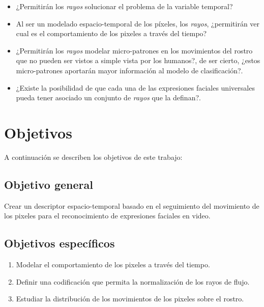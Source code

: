 \begin{itemize}
	\item ¿Permitirán los \textit{rayos} solucionar el problema de la variable temporal?
	\item Al ser un modelado espacio-temporal de los píxeles, los \textit{rayos}, ¿permitirán ver cual es el comportamiento de los pixeles a través del tiempo?
	\item ¿Permitirán los \textit{rayos} modelar micro-patrones en los movimientos del rostro que no pueden ser vistos a simple vista por los humanos?, de ser cierto, ¿estos micro-patrones aportarán mayor información al modelo de clasificación?.
	\item ¿Existe la posibilidad de que cada una de las expresiones faciales universales pueda tener asociado un conjunto de \textit{rayos} que la definan?. 
\end{itemize}


\section{Objetivos}
\label{subsec:objetivos}
A continuación se describen los objetivos de este trabajo:

\subsection{Objetivo general}
\label{subsubsec:objgeneral}
Crear un descriptor espacio-temporal basado en el seguimiento del movimiento de los pixeles para el reconocimiento de expresiones faciales en video.


\subsection{Objetivos específicos}
\label{subsubsec:objgeneral}
	\begin{enumerate}
		\item Modelar el comportamiento de los pixeles a través del tiempo.
		\item Definir una codificación que permita la normalización de los rayos de flujo.
		\item Estudiar la distribución de los movimientos de los pixeles sobre el rostro.
	\end{enumerate}